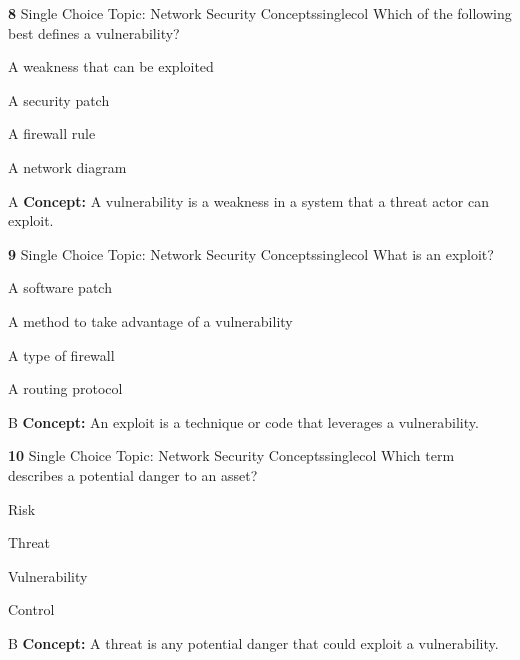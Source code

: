 \documentclass[10pt,a4paper]{article}
\begin{document}
\begin{qcard}{\color{white}\textbf{8} \hfill \small Single Choice \textbar{} Topic: Network Security Concepts}{singlecol}
Which of the following best defines a vulnerability?

\begin{qoptions}
\item A weakness that can be exploited
\item A security patch
\item A firewall rule
\item A network diagram
\end{qoptions}
\begin{explainbox}{A}
\textbf{Concept:} A vulnerability is a weakness in a system that a threat actor can exploit.
\end{explainbox}
\end{qcard}

\begin{qcard}{\color{white}\textbf{9} \hfill \small Single Choice \textbar{} Topic: Network Security Concepts}{singlecol}
What is an exploit?

\begin{qoptions}
\item A software patch
\item A method to take advantage of a vulnerability
\item A type of firewall
\item A routing protocol
\end{qoptions}
\begin{explainbox}{B}
\textbf{Concept:} An exploit is a technique or code that leverages a vulnerability.
\end{explainbox}
\end{qcard}

\begin{qcard}{\color{white}\textbf{10} \hfill \small Single Choice \textbar{} Topic: Network Security Concepts}{singlecol}
Which term describes a potential danger to an asset?

\begin{qoptions}
\item Risk
\item Threat
\item Vulnerability
\item Control
\end{qoptions}
\begin{explainbox}{B}
\textbf{Concept:} A threat is any potential danger that could exploit a vulnerability.
\end{explainbox}
\end{qcard}
\end{document}
